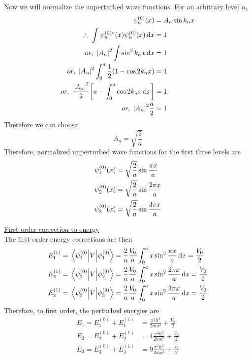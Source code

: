 \begin{enumerate}[label=Problem.\arabic*,start=1]
			Now we will normalize the unperturbed wave functions. For an arbitrary level $n$,
			\begin{align*}
				\psi_n^{(0)}\qty(x) &= A_n \sin k_n x \\
				\therefore \ \int \psi_n^{(0)*}\qty(x) \psi_n^{(0)}\qty(x) \dd{x} &= 1 \\
				or,\ \abs{A_n}^2 \int \sin^2 k_n x \dd{x} &= 1 \\
				or,\ \abs{A_n}^2 \int_{0}^{a} \frac{1}{2} \qty(1 - \cos 2 k_n x) &= 1 \\
				or,\ \frac{\abs{A_n}^2}{2} \qty[a - \int_{0}^{a} \cos 2 k_n x \dd{x}] &= 1 \\
				or, \ \abs{A_n}^2 \frac{a}{2} &= 1
			\end{align*}
			Therefore we can choose
			\begin{equation}
				A_n = \sqrt{\frac{2}{a}}
			\end{equation}
			Therefore, normalized unperturbed wave functions for the first three levels are
			\begin{align*}
				\psi_1^{(0)} \qty(x) &=  \sqrt{\frac{2}{a}} \sin \frac{\pi x }{a} \\
				\psi_2^{(0)} \qty(x) &=  \sqrt{\frac{2}{a}} \sin \frac{2\pi x }{a} \\
				\psi_3^{(0)} \qty(x) &=  \sqrt{\frac{2}{a}} \sin \frac{3\pi x }{a} 
			\end{align*}
			
			\underline{First order correction to energy}\\
			The first-order energy corrections are then
			\begin{align*}
				E_1^{(1)} = \expval{V}{\psi_1^{(0)}} &= \frac{2}{a} \frac{V_0}{a} \int_{0}^{a} x \sin^2 \frac{\pi x}{a} \dd{x} = \frac{V_0}{2} \\
				E_2^{(1)} = \expval{V}{\psi_2^{(0)}} &= \frac{2}{a} \frac{V_0}{a} \int_{0}^{a} x \sin^2 \frac{2\pi x}{a} \dd{x} = \frac{V_0}{2} \\
				E_3^{(1)} = \expval{V}{\psi_3^{(0)}} &= \frac{2}{a} \frac{V_0}{a} \int_{0}^{a} x \sin^2 \frac{3\pi x}{a} \dd{x} = \frac{V_0}{2} \\
			\end{align*}
			Therefore, to first order, the perturbed energies are
			\begin{align}
				E_1 = E_1^{(0)} + E_1^{(1)} &= \frac{\pi^2 \hbar^2}{2 m a^2} + \frac{V_0}{2} \\
				E_2 = E_2^{(0)} + E_2^{(1)} &= 4\frac{\pi^2 \hbar^2}{2 m a^2} + \frac{V_0}{2} \\
				E_3 = E_3^{(0)} + E_3^{(1)} &= 9\frac{\pi^2 \hbar^2}{2 m a^2} + \frac{V_0}{2} \\
			\end{align}
			

\end{enumerate}
